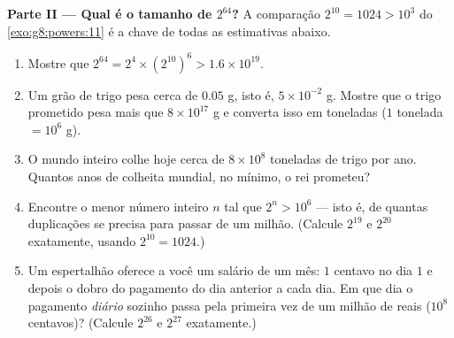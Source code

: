 \begin{problem}[{Problema de fim de semana --- a \omterm{def:g1:addition:def}{soma} geométrica
$1 + 2 + 4 + \dots + 2^{n-1} = 2^n - 1$, de uma lenda famosa aos
números binários}]
\medskip
\noindent\textbf{Parte II --- Qual é o tamanho de $2^{64}$?}
A comparação $2^{10} = 1024 > 10^3$ do \cref{exo:g8:powers:11} é a
chave de todas as estimativas abaixo.
\begin{enumerate}[resume]
  \item Mostre que
        $2^{64} = 2^4 \times \left(2^{10}\right)^6 > 1.6 \times
        10^{19}$.
  \item Um grão de trigo pesa cerca de $0.05$ g, isto é,
        $5 \times 10^{-2}$ g. Mostre que o trigo prometido pesa mais
        que $8 \times 10^{17}$ g e converta isso em toneladas ($1$
        tonelada $= 10^6$ g).
  \item O mundo inteiro colhe hoje cerca de $8 \times 10^8$ toneladas
        de trigo por ano. Quantos anos de colheita mundial, no mínimo,
        o rei prometeu?
  \item Encontre o menor número inteiro $n$ tal que $2^n > 10^6$ ---
        isto é, de quantas duplicações se precisa para passar de um
        milhão. (Calcule $2^{19}$ e $2^{20}$ exatamente, usando
        $2^{10} = 1024$.)
  \item Um espertalhão oferece a você um salário de um mês: $1$ centavo
        no dia $1$ e depois o dobro do pagamento do dia anterior a cada
        dia. Em que dia o pagamento \emph{diário} sozinho passa pela
        primeira vez de um milhão de reais ($10^8$ centavos)? (Calcule
        $2^{26}$ e $2^{27}$ exatamente.)
\end{enumerate}


\end{problem}
